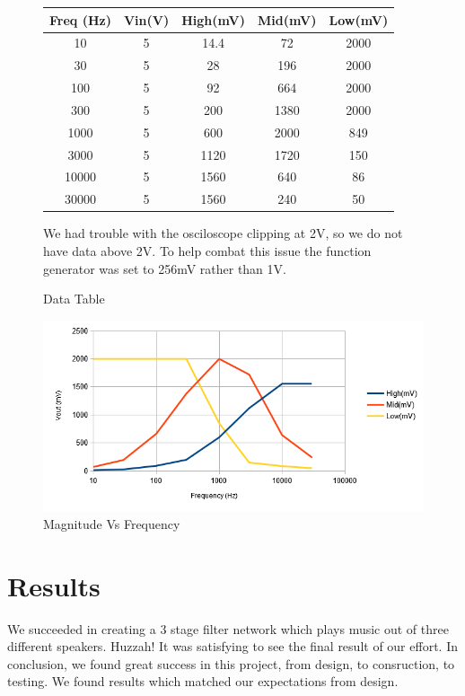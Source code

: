 \documentclass{article}
\begin{document}
\begin{figure}[!ht]
\caption{Data Table}
\begin{center}
\begin{tabular}{|c|c|c|c|c|}
\hline
Freq (Hz)&Vin(V)&High(mV)&Mid(mV)&Low(mV)\\
\hline
10&5&14.4&72&2000\\
\hline
30&5&28&196&2000\\
\hline
100&5&92&664&2000\\
\hline
300&5&200&1380&2000\\
\hline
1000&5&600&2000&849\\
\hline
3000&5&1120&1720&150\\
\hline
10000&5&1560&640&86\\
\hline
30000&5&1560&240&50\\
\hline
\end{tabular}
\begin{flushleft}
We had trouble with the osciloscope clipping at 2V, so we do not have data above 2V. To help combat this issue the function generator was set to 256mV rather than 1V.
\end{flushleft}
\end{center}
\end{figure}
\begin{figure}[!h]
\centering
\caption{Magnitude Vs Frequency}
\includegraphics[width=\linewidth]{magnitudevsfrequency}
\end{figure}
\section*{Results}
We succeeded in creating a 3 stage filter network which plays music out of 
three different speakers. Huzzah! It was satisfying to see the final result
of our effort. In conclusion, we found great success in this project, from design, 
to consruction, to testing. We found results which matched our expectations 
from design. 
\end{document}

